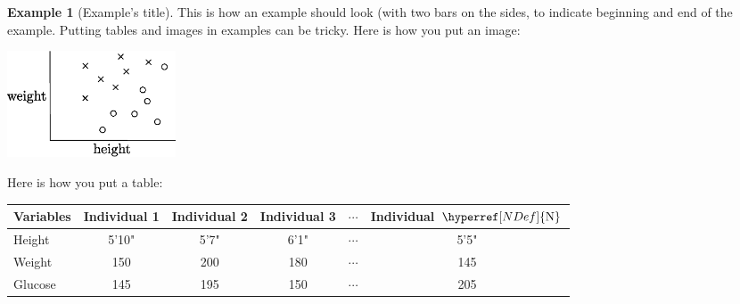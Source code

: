 \documentclass{article}
\theoremstyle{definition}
\newtheorem{myExample}{Example}
\def \N{{\hyperref[NDef]{{\rm N}}}} %
\begin{document}
\begin{siderules}
\begin{myExample}[Example's title]
This is how an example should look (with two bars on the sides, to indicate beginning and end of the example. Putting tables and images in examples can be tricky. Here is how you put an image:

\center
\includegraphics[width=5cm]{example_figure.eps}
\justify

Here is how you put a table:

\begin{center}
\begin{tabular}{| l || c | c | c | c | c |}
\hline
\textbf{Variables} & Individual 1 & Individual 2 & Individual 3 & $\cdots$ & Individual $\N$ \\ \hline \hline
Height & 5'10" & 5'7" & 6'1" & $\cdots$ & 5'5" \\ \hline
Weight & 150 & 200 & 180 & $\cdots$ & 145 \\ \hline
Glucose & 145 & 195 & 150 & $\cdots$ & 205 \\ \hline
\end{tabular}
\end{center}

\end{myExample}
\end{siderules}
\end{document}
